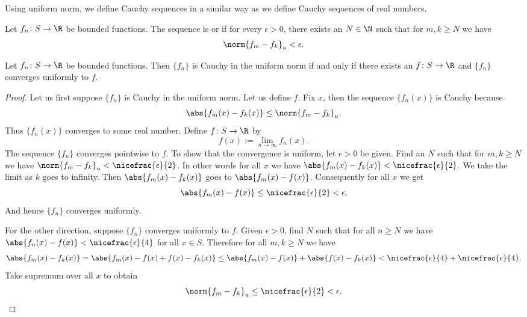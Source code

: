 \documentclass[12pt]{book}
\begin{document}
Using uniform norm, we define Cauchy sequences in a similar way
as we define Cauchy sequences of real numbers.

\begin{defn}
Let $f_n \colon S \to \R$ be bounded functions.
The sequence is \emph{}
or \emph{}
if for every $\epsilon > 0$, there exists an $N \in \N$ such
that for $m,k \geq N$ we have
\begin{equation*}
\norm{f_m-f_k}_u < \epsilon .
\end{equation*}
\end{defn}

\begin{prop} \label{prop:uniformcauchy}
Let $f_n \colon S \to \R$ be bounded functions.
Then $\{ f_n \}$ is Cauchy in the uniform norm if and only if
there exists an $f \colon S \to \R$ and $\{ f_n \}$ converges
uniformly to $f$.
\end{prop}

\begin{proof}
Let us first suppose $\{ f_n \}$ is Cauchy in the uniform norm.
Let us define $f$.
Fix $x$, then
the sequence $\{ f_n(x) \}$ is Cauchy because
\begin{equation*}
\abs{f_m(x)-f_k(x)}
\leq
\norm{f_m-f_k}_u .
\end{equation*}
Thus $\{ f_n(x) \}$ converges to some real number.
Define $f \colon S
\to \R$ by
\begin{equation*}
f(x) := \lim_{n \to \infty} f_n(x) .
\end{equation*}
The sequence
$\{ f_n \}$ converges pointwise to $f$.
To show that the convergence
is uniform, let $\epsilon > 0$ be given.
Find an $N$ such that
for $m, k \geq N$ we have
$\norm{f_m-f_k}_u < \nicefrac{\epsilon}{2}$.
In other words for
all $x$ we have
$\abs{f_m(x)-f_k(x)} < \nicefrac{\epsilon}{2}$.
We take the limit
as $k$ goes to infinity.
Then $\abs{f_m(x)-f_k(x)}$
goes to $\abs{f_m(x)-f(x)}$.
Consequently for all $x$ we get
\begin{equation*}
\abs{f_m(x)-f(x)} \leq \nicefrac{\epsilon}{2} < \epsilon .
\end{equation*}
And hence $\{ f_n \}$ converges uniformly.

For the other direction, suppose $\{ f_n \}$ converges uniformly to
$f$.
Given $\epsilon > 0$, find $N$ such that for all $n \geq N$
we have $\abs{f_n(x)-f(x)} < \nicefrac{\epsilon}{4}$ for all $x \in S$.
Therefore for all $m, k \geq N$ we have
\begin{equation*}
\abs{f_m(x)-f_k(x)} = 
\abs{f_m(x)-f(x)+f(x)-f_k(x)} \leq
\abs{f_m(x)-f(x)}+\abs{f(x)-f_k(x)} < \nicefrac{\epsilon}{4} +
\nicefrac{\epsilon}{4} .
\end{equation*}
Take supremum over all $x$ to obtain
\begin{equation*}
\norm{f_m-f_k}_u \leq \nicefrac{\epsilon}{2} < \epsilon .  \qedhere
\end{equation*}
\end{proof}
\end{document}
